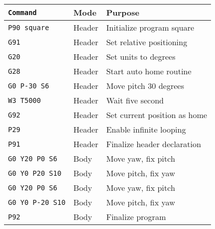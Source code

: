 \begin{tabular}{lll}
  \hline
  \texttt{Command}        & Mode   & Purpose                      \\
  \hline
  \texttt{P90 square}     & Header & Initialize program square    \\
  \texttt{G91}            & Header & Set relative positioning     \\
  \texttt{G20}            & Header & Set units to degrees         \\
  \texttt{G28}            & Header & Start auto home routine      \\
  \texttt{G0 P-30 S6}     & Header & Move pitch 30 degrees        \\
  \texttt{W3 T5000}       & Header & Wait five second             \\
  \texttt{G92}            & Header & Set current position as home \\
  \texttt{P29}            & Header & Enable infinite looping      \\
  \texttt{P91}            & Header & Finalize header declaration  \\
  \texttt{G0 Y20 P0 S6}   & Body & Move yaw, fix pitch          \\
  \texttt{G0 Y0 P20 S10}  & Body & Move pitch, fix yaw          \\
  \texttt{G0 Y20 P0 S6}   & Body & Move yaw, fix pitch          \\
  \texttt{G0 Y0 P-20 S10} & Body & Move pitch, fix yaw          \\
  \texttt{P92}            & Body   & Finalize program             \\
  \hline
\end{tabular}
